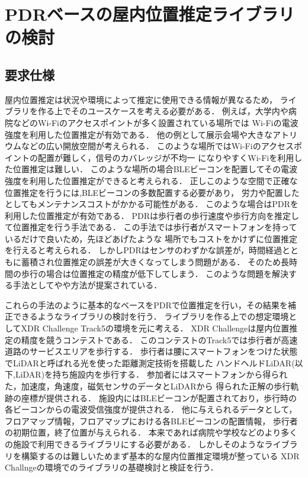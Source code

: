 \documentclass[Japanese]{dicomopapers}
\begin{document}
\section{PDRベースの屋内位置推定ライブラリの検討}

\subsection{要求仕様}

屋内位置推定は状況や環境によって推定に使用できる情報が異なるため，
ライブラリを作る上でそのユースケースを考える必要がある．
例えば，大学内や病院などのWi-Fiのアクセスポイントが多く設置されている場所では
Wi-Fiの電波強度を利用した位置推定が有効である．
他の例として展示会場や大きなアトリウムなどの広い開放空間が考えられる．
このような場所ではWi-Fiのアクセスポイントの配置が難しく，信号のカバレッジが不均一
になりやすくWi-Fiを利用した位置推定は難しい．
このような場所の場合BLEビーコンを配置してその電波強度を利用した位置推定ができると考えられる．
正しこのような空間で正確な位置推定を行うには,BLEビーコンの多数配置する必要があり，
労力や配置したとしてもメンテナンスコストがかかる可能性がある．
このような場合はPDRを利用した位置推定が有効である．
PDRは歩行者の歩行速度や歩行方向を推定して位置推定を行う手法である．
この手法では歩行者がスマートフォンを持っているだけで良いため，先ほどあげたような
場所でもコストをかけずに位置推定を行えると考えられる．
しかしPDRはセンサのわずかな誤差が，時間経過とともに蓄積され位置推定の誤差が大きくなってしまう問題がある．
そのため長時間の歩行の場合は位置推定の精度が低下してしまう．
このような問題を解決する手法として\cite{pdr-wifi}や\cite{pdr-ble}や方法が提案されている．

これらの手法のように基本的なベースをPDRで位置推定を行い，その結果を補正できるようなライブラリの検討を行う．
ライブラリを作る上での想定環境としてXDR Challenge Track5の環境を元に考える．
XDR Challengeは屋内位置推定の精度を競うコンテストである．
このコンテストのTrack5では歩行者が高速道路のサービスエリアを歩行する．
歩行者は腰にスマートフォンをつけた状態でLiDARと呼ばれる光を使った距離測定技術を搭載した
ハンドヘルドLiDAR(以下,LiDAR)を持ち施設内を歩行する．
参加者にはスマートフォンから得られた，加速度，角速度，磁気センサのデータとLiDARから
得られた正解の歩行軌跡の座標が提供される．
施設内にはBLEビーコンが配置されており，歩行時の各ビーコンからの電波受信強度が提供される．
他に与えられるデータとして，フロアマップ情報，フロアマップにおける各BLEビーコンの配置情報，
歩行者の初期位置，終了位置が与えられる．
本来であれば病院や学校などのより多くの施設で利用できるライブラリにする必要がある．
しかしそのようなライブラリを構築するのは難しいためまず基本的な屋内位置推定環境が整っている
XDR Challngeの環境でのライブラリの基礎検討と検証を行う．
\end{document}
